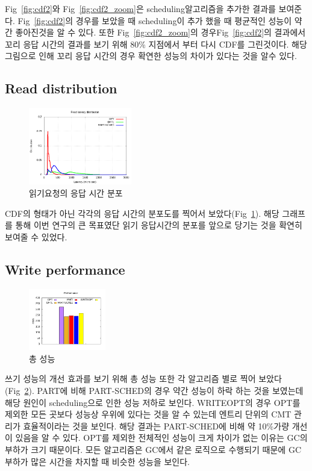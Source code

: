 \documentclass[conference]{IEEEtran}
\begin{document}
Fig~\ref{fig:cdf2}와 Fig~\ref{fig:cdf2_zoom}은 scheduling알고리즘을 추가한 결과를 보여준다.
Fig~\ref{fig:cdf2}의 경우를 보았을 때 scheduling이 추가 했을 때 평균적인 성능이 약간 좋아진것을 
알 수 있다. 또한 Fig~\ref{fig:cdf2_zoom}의 경우Fig~\ref{fig:cdf2}의 결과에서 꼬리 응답 시간의 
결과를 보기 위해 80\% 지점에서 부터 다시 CDF를 그린것이다. 해당 그림으로 인해 꼬리 응답 시간의
경우 확연한 성능의 차이가 있다는 것을 알수 있다.

\subsection{Read distribution}
\begin{figure}[h]
	\centering
	\includegraphics[width=0.4\textwidth]{image/EVAL/dist.png}
	\caption{읽기요청의  응답 시간 분포}
	\label{fig:dist}
\end{figure}
CDF의 형태가 아닌 각각의 응답 시간의 분포도를 찍어서 보았다(Fig~\ref{fig:dist}). 해당 그래프를 통해 이번 연구의 
큰 목표였단 읽기 응답시간의 분포를 앞으로 당기는 것을 확연히 보여줄 수 있었다.
\subsection{Write performance}
\begin{figure}[h]
	\centering
	\includegraphics[width=0.3\textwidth]{image/EVAL/through.png}
	\caption{총 성능}
	\label{fig:through}
\end{figure}
쓰기 성능의 개선 효과를 보기 위해 총 성능 또한 각 알고리즘 별로 찍어 보았다(Fig~\ref{fig:through}). PART에 비해 
PART-SCHED의 경우 약간 성능이 하락 하는 것을 보였는데 해당 원인이 scheduling으로 인한 성능 
저하로 보인다. WRITEOPT의 경우 OPT를 제외한 모든 곳보다 성능상 우위에 있다는 것을 알 수 있는데 
엔트리 단위의 CMT 관리가 효율적이라는 것을 보인다. 해당 결과는 PART-SCHED에 비해 약 10\%가량 개선이 
있음을 알 수 있다. OPT를 제외한 전체적인 성능이 크게 차이가 없는 이유는 GC의 부하가 크기 때문이다. 
모든 알고리즘은 GC에서 같은 로직으로 수행되기 때문에 GC 부하가 많은 시간을 차지할 때 비슷한 성능을 보인다. 
\end{document}
